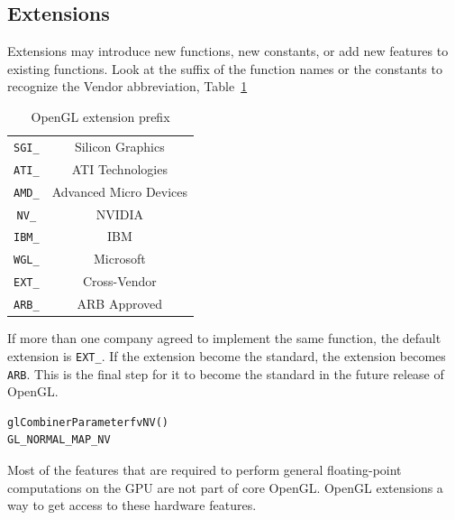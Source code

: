 \subsection{Extensions}
\label{sec:extensions}

Extensions may introduce new functions, new constants, or
add new features to existing functions. Look at the suffix of the
function names or the constants to recognize the Vendor abbreviation, Table~\ref{tab:GL_prefix}

\begin{table}[hbt]
\begin{center}
\caption{OpenGL extension prefix}
\begin{tabular}{cc} 
\hline
\verb!SGI_! &  Silicon Graphics \\
\verb!ATI_! &  ATI Technologies \\
\verb!AMD_! &  Advanced Micro Devices \\
\verb!NV_! &  NVIDIA \\
\verb!IBM_! &  IBM \\
\verb!WGL_! &  Microsoft \\
\verb!EXT_! &  Cross-Vendor \\
\verb!ARB_! &  ARB Approved \\
\hline\hline
\end{tabular}
\end{center}
\label{tab:GL_prefix}
\end{table}
If more than one company agreed to implement the same function, the
default extension is \verb!EXT_!. If the extension become the
standard, the extension becomes \verb!ARB!. This is the final step for
it to become the standard in the future release of OpenGL. 

\begin{verbatim}
glCombinerParameterfvNV()
GL_NORMAL_MAP_NV
\end{verbatim}


\begin{framed}
  Most of the features that are required to perform general
  floating-point computations on the GPU are not part of core
  OpenGL. OpenGL extensions a way to get access to these hardware
  features. 
\end{framed}


